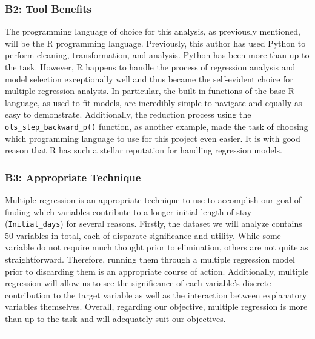 \documentclass[
]{article}
\begin{document}
\hypertarget{b2-tool-benefits}{%
\subsubsection{B2: Tool Benefits}\label{b2-tool-benefits}}

The programming language of choice for this analysis, as previously
mentioned, will be the \(\mbox{R}\) programming language. Previously,
this author has used Python to perform cleaning, transformation, and
analysis. Python has been more than up to the task. However,
\(\mbox{R}\) happens to handle the process of regression analysis and
model selection exceptionally well and thus became the self-evident
choice for multiple regression analysis. In particular, the built-in
functions of the base \(\mbox{R}\) language, as used to fit models, are
incredibly simple to navigate and equally as easy to demonstrate.
Additionally, the reduction process using the
\texttt{ols\_step\_backward\_p()} function, as another example, made the
task of choosing which programming language to use for this project even
easier. It is with good reason that \(\mbox{R}\) has such a stellar
reputation for handling regression models.

\hypertarget{b3-appropriate-technique}{%
\subsubsection{B3: Appropriate
Technique}\label{b3-appropriate-technique}}

Multiple regression is an appropriate technique to use to accomplish our
goal of finding which variables contribute to a longer initial length of
stay (\texttt{Initial\_days}) for several reasons. Firstly, the dataset
we will analyze contains 50 variables in total, each of disparate
significance and utility. While some variable do not require much
thought prior to elimination, others are not quite as straightforward.
Therefore, running them through a multiple regression model prior to
discarding them is an appropriate course of action. Additionally,
multiple regression will allow us to see the significance of each
variable's discrete contribution to the target variable as well as the
interaction between explanatory variables themselves. Overall, regarding
our objective, multiple regression is more than up to the task and will
adequately suit our objectives.

\begin{center}\rule{0.5\linewidth}{0.5pt}\end{center}
\end{document}
